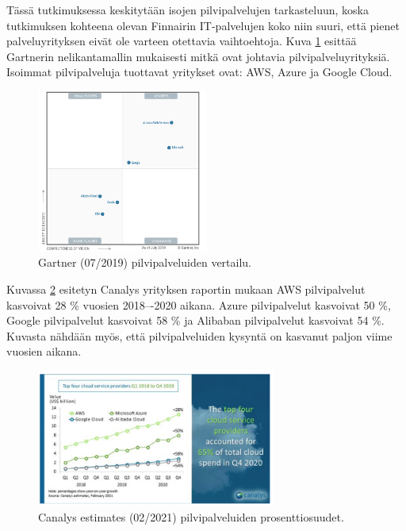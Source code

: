 Tässä tutkimuksessa keskitytään isojen pilvipalvelujen tarkasteluun, koska tutkimuksen kohteena olevan Finnairin IT-palvelujen koko niin suuri, että pienet palveluyrityksen eivät ole varteen otettavia vaihtoehtoja. Kuva \ref{gartner} esittää Gartnerin nelikantamallin mukaisesti mitkä ovat johtavia pilvipalveluyrityksiä. Isoimmat pilvipalveluja tuottavat yritykset ovat: AWS, Azure ja Google Cloud.

\begin{figure}[ht]
\centering 
\includegraphics[width=0.50\textwidth]{figures/CloudIaaS.png}
\caption{Gartner (07/2019) pilvipalveluiden vertailu. \citep{top_cloud}}\label{gartner}
\end{figure}

Kuvassa \ref{canalys} esitetyn Canalys yrityksen raportin mukaan AWS pilvipalvelut kasvoivat 28 \% vuosien 2018–-2020 aikana. Azure pilvipalvelut kasvoivat 50 \%, Google pilvipalvelut kasvoivat 58 \% ja Alibaban pilvipalvelut kasvoivat 54 \%. Kuvasta nähdään myös, että pilvipalveluiden kysyntä on kasvanut paljon viime vuosien aikana.

\begin{figure}[ht]
\centering 
\includegraphics[width=0.70\textwidth]{figures/Canalys.png}
\caption{Canalys estimates (02/2021) pilvipalveluiden prosenttiosuudet. \citep{top_cloud}}\label{canalys}
\end{figure}

